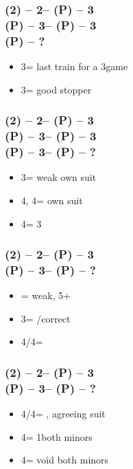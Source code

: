 \documentclass[12pt, a4paper]{article}
\begin{document}
\subsubsection*{(2\spades) -- 2\nt -- (P) -- 3\clubs \\
                (P) -- 3\diams -- (P) -- 3\hearts \\
                (P) -- ?}
\begin{itemize}
    \item 3\spades = last train for a 3\nt game
    \item 3\nt = good \spades stopper
\end{itemize}

\subsubsection*{(2\spades) -- 2\nt -- (P) -- 3\clubs \\
                (P) -- 3\diams -- (P) -- 3\hearts \\
                (P) -- 3\spades -- (P) -- ?}
\begin{itemize}
    \item 3\nt = weak own suit
    \item 4\clubs, 4\diams = own suit
    \item 4\hearts = 3\hearts
\end{itemize}

\subsubsection*{(2\spades) -- 2\nt -- (P) -- 3\diams \\
                (P) -- 3\hearts -- (P) -- ?}
\begin{itemize}
    \item \pass = weak, 5+\hearts
    \item 3\nt = \pass/correct
    \item 4\clubs/4\diams = \nat
\end{itemize}

\subsubsection*{(2\spades) -- 2\nt -- (P) -- 3\hearts \\
                (P) -- 3\spades -- (P) -- ?}
\begin{itemize}
    \item 4\clubs/4\diams = \nat, agreeing suit
    \item 4\hearts = 1\spades both minors
    \item 4\spades = void \spades both minors
\end{itemize}
\end{document}
